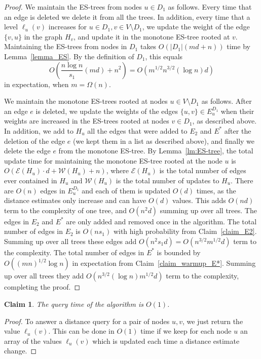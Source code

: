 \documentclass[11pt]{article}
\newtheorem{claim}[theorem]{Claim}
\theoremstyle{definition}
\theoremstyle{remark}
\begin{document}
\begin{titlepage}
\begin{proof}
We maintain the ES-trees from nodes $u \in D_1$ as follows. Every time that an edge is deleted we delete it from all the trees. In addition, every time that a level $\ell_u(v)$ increases for $u \in D_1, v \in V \setminus D_1$, we update the weight of the edge $\{v,u\}$ in the graph $H_v$, and update it in the monotone ES-tree rooted at $v$.
Maintaining the ES-trees from nodes in $D_1$ takes $O(|D_1|(md+n))$ time by Lemma~\ref{lemma_ES}. By the definition of $D_1$, this equals $$O \left( \frac{n \log{n}}{s_1} \left( md \right) + n^2 \right) =O(m^{1/2}n^{3/2} (\log{n}) d)$$ in expectation, when $m=\Omega(n).$

We maintain the monotone ES-trees rooted at nodes $u \in V \setminus D_1$ as follows. After an edge $e$ is deleted, we update the weights of the edges $\{u,v\} \in E_u^{D_1}$ when their weights are increased in the ES-trees rooted at nodes $v \in D_1$, as described above. In addition, we add to $H_u$ all the edges that were added to $E_2$ and $E^*$ after the deletion of the edge $e$ (we kept them in a list as described above), and finally we delete the edge $e$ from the monotone ES-tree. By Lemma~\ref{lm:ES-tree}, the total update time for maintaining the monotone ES-tree rooted at the node $u$ is 
$O(\mathcal E(H_u)\cdot d+\mathcal W(H_u)+n)$, where $\mathcal E(H_u)$ is the total number of edges ever contained in $H_u$ and $\mathcal W(H_u)$ is the total number of updates to $H_u$. There are $O(n)$ edges in $E_u^{D_1}$ and each of them is updated $O(d)$ times, as the distance estimates only increase and can have $O(d)$ values. This adds $O(nd)$ term to the complexity of one tree, and $O(n^2 d)$ summing up over all trees. The edges in $E_2$ and $E^*$ are only added and removed once in the algorithm. The total number of edges in $E_2$ is $O(ns_1)$ with high probability from Claim~\ref{claim_E2}. Summing up over all trees these edges add $O(n^2 s_1 d)= O(n^{3/2} m^{1/2} d)$ term to the complexity. The total number of edges in $E^*$ is bounded by $O( (mn)^{1/2}\log{n} )$ in expectation from Claim~\ref{claim_warmup_E*}. Summing up over all trees they add $O(n^{3/2} (\log{n}) m^{1/2} d)$ term to the complexity, completing the proof.
\end{proof} 

\begin{claim}
The query time of the algorithm is $O(1)$.
\end{claim}

\begin{proof}
To answer a distance query for a pair of nodes $u,v$, we just return the value $\ell_u(v)$. This can be done in $O(1)$ time if we keep for each node $u$ an array of the values $\ell_u(v)$ which is updated each time a distance estimate change.
\end{proof}


\end{titlepage}
\end{document}
